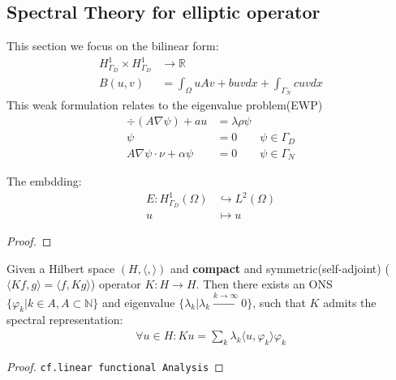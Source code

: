 \subsection{Spectral Theory for elliptic operator}
This section we focus on the bilinear form:
\begin{align*}
	H^1_{\Gamma_D} \times H^1_{\Gamma_D} &\rightarrow \mathbb{R} \\
	B(u, v) &= \int_\Omega u A v + buv dx + \int_{\Gamma_N} c uv dx
\end{align*}
This weak formulation relates to the eigenvalue problem(EWP)
\begin{align*}
	\div(A \nabla\psi) + au &= \lambda \rho \psi \\
	\psi &= 0 \qquad  \psi \in \Gamma_D\\
	A \nabla \psi \cdot \nu + \alpha \psi &= 0 \qquad \psi \in \Gamma_N
\end{align*}

\begin{lemma}
	The embdding:
	\begin{align*}
		E: H^1_{\Gamma_D}(\Omega) &\hookrightarrow L^2(\Omega)\\
			u &\mapsto u
	\end{align*}
\end{lemma}
\begin{proof}
\end{proof}

\begin{lemma}
	Given a Hilbert space $(H, \langle , \rangle)$ and \textbf{compact} and symmetric(self-adjoint) ($\langle Kf, g \rangle = \langle f, Kg   \rangle$) operator $K: H \rightarrow H$. Then there exists an ONS $\{ \varphi_k | k \in A, A \subset \mathbb{N}\}$ and eigenvalue $\{\lambda_k | \lambda_k \overset{k \rightarrow \infty}{\rightarrow} 0\}$, such that $K$ admits the spectral representation:
	\begin{align*}
		\forall u \in H: Ku = \sum_{k} \lambda_k \langle u, \varphi_k\rangle \varphi_k
	\end{align*}
\end{lemma}
\begin{proof}
	\texttt{cf.linear functional Analysis}
\end{proof}

